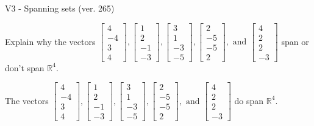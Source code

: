 \begin{exercise}
  \begin{exerciseTitle}V3 - Spanning sets (ver. 265)\end{exerciseTitle}
  \begin{exerciseStatement}
    Explain why the vectors \(\left[\begin{array}{r}
4 \\
-4 \\
3 \\
4
\end{array}\right] , \left[\begin{array}{r}
1 \\
2 \\
-1 \\
-3
\end{array}\right] , \left[\begin{array}{r}
3 \\
1 \\
-3 \\
-5
\end{array}\right] , \left[\begin{array}{r}
2 \\
-5 \\
-5 \\
2
\end{array}\right] , \text{ and } \left[\begin{array}{r}
4 \\
2 \\
2 \\
-3
\end{array}\right]\) span or don't span \(\mathbb{R}^4\). 
	


  \end{exerciseStatement}
  \begin{exerciseAnswer}
   The vectors \(\left[\begin{array}{r}
4 \\
-4 \\
3 \\
4
\end{array}\right] , \left[\begin{array}{r}
1 \\
2 \\
-1 \\
-3
\end{array}\right] , \left[\begin{array}{r}
3 \\
1 \\
-3 \\
-5
\end{array}\right] , \left[\begin{array}{r}
2 \\
-5 \\
-5 \\
2
\end{array}\right] , \text{ and } \left[\begin{array}{r}
4 \\
2 \\
2 \\
-3
\end{array}\right]\) 
  	 do  
	span \(\mathbb{R}^4\).
  



\end{exerciseAnswer}
\end{exercise}
